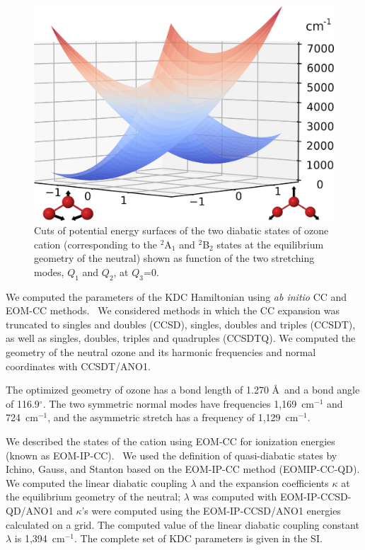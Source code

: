 \documentclass[12pt,prb,aps]{revtex4}
\begin{document}
\begin{figure}[h!]
\includegraphics[width = 8 cm]{./figures/KDC_PES.png}
\caption{Cuts of potential energy surfaces of the two diabatic states of ozone cation 
(corresponding to the $^2$A$_1$ and $^2$B$_2$ states at the equilibrium geometry of the 
neutral) shown as function of the two stretching modes, $Q_1$ and $Q_2$, at $Q_3$=0.
\label{fig:KDC}}
\end{figure}

We computed the parameters of the KDC Hamiltonian using \emph{ab
initio} CC and EOM-CC methods.~\cite{Bartlett:CC_review:07, Krylov:EOMRev:07, Bartlett:Book:09,Christiansen:EOMRev:11, Bartlet:EOMRev:12, Krylov:OSRev} 
We considered methods in which the CC expansion was truncated to singles and doubles (CCSD), singles, doubles and triples (CCSDT), as well as singles, doubles, triples and quadruples (CCSDTQ).\cite{Matthews:ncc:2015}  
We computed the geometry of the neutral ozone and its harmonic
frequencies and normal coordinates with CCSDT/ANO1.~\cite{Almlof:ANO,Almlof:ANO:1988} 

The optimized geometry of ozone has a bond length of 1.270 \AA\ and a
bond angle of 116.9$^\circ$. The two symmetric normal modes have frequencies
1,169~cm$^{-1}$ and 724~cm$^{-1}$, and the asymmetric stretch has a
frequency of 1,129~cm$^{-1}$. 

We described the states of the cation using 
EOM-CC for ionization energies (known as EOM-IP-CC).~\cite{StantonGauss:EOMIP:99} 
We used the definition of quasi-diabatic states by Ichino, Gauss, and Stanton\cite{Stanton:EOMIPdeg:09}  based on the  EOM-IP-CC method (EOMIP-CC-QD). 
We computed the linear diabatic coupling $\lambda$ and the expansion coefficients $\kappa$ at the equilibrium geometry of the neutral; $\lambda$ was computed with 
EOM-IP-CCSD-QD/ANO1 and  $\kappa$'s were computed using the
EOM-IP-CCSD/ANO1 energies calculated on a grid. The computed value of the linear diabatic coupling constant $\lambda$ is 1,394~cm$^{-1}$. The complete set of KDC parameters is given in the SI.
\end{document}
